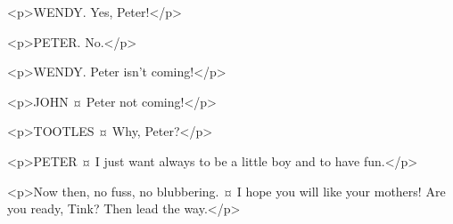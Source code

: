 <p>WENDY. Yes, Peter!</p>

<p>PETER. No.</p>


<p>WENDY. Peter isn't coming!</p>


<p>JOHN ¤
Peter not coming!</p>

<p>TOOTLES ¤
Why, Peter?</p>

<p>PETER ¤
I just want always to be a little boy and to have fun.</p>


<p>Now then, no fuss, no blubbering.
¤
I hope you will like your mothers! Are you ready, Tink? Then lead the way.</p>

